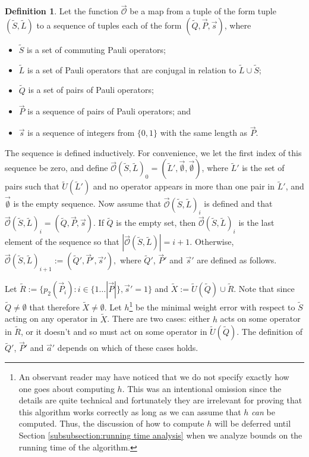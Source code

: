 \documentclass[12pt]{amsbook}
\theoremstyle{plain}
\theoremstyle{definition}
\newtheorem{definition}{Definition}
\theoremstyle{remark}
\newcommand{\lst}{\vec}
\newcommand{\set}{\tilde}
\newcommand{\optimizer}{\lst{\mathcal{O}}}
\begin{document}
\begin{definition}
Let the function $\optimizer$ be a map from a tuple of the form tuple $(\set S,\set L)$ to a sequence of tuples each of the form $(\set Q,\lst P,\lst s)$, where
\begin{itemize}
\item $\set S$ is a set of commuting Pauli operators;
\item $\set L$ is a set of Pauli operators that are conjugal in relation to $\set L\cup\set S$;
\item $\set Q$ is a set of pairs of Pauli operators;
\item $\lst P$ is a sequence of pairs of Pauli operators; and
\item $\lst s$ is a sequence of integers from $\{0,1\}$ with the same length as $\lst P$.
\end{itemize}

The sequence is defined inductively.  For convenience, we let the first index of this sequence be zero, and define $\optimizer(\set S,\set L)_0=(\set L',\lst\emptyset,\lst\emptyset)$, where $\set L'$ is the set of pairs such that $\set U(\set L')$ and no operator appears in more than one pair in $\set L'$, and $\lst\emptyset$ is the empty sequence.  Now assume that $\optimizer(\set S,\set L)_i$ is defined and that $\optimizer(\set S,\set L)_i=(\set Q,\lst P,\lst s)$.  If $\set Q$ is the empty set, then $\optimizer(\set S,\set L)_i$ is the last element of the sequence so that $|\optimizer(\set S,\set L)|=i+1$.  Otherwise, $\optimizer(\set S,\set L)_{i+1}:=(\set Q',\lst P',\lst s'),$ where $\set Q'$, $\lst P'$ and $\lst s'$ are defined as follows.

Let $\set R:=\{p_2(\lst P_i):i\in\{1\dots |\lst P|\},\lst s'=1\}$ and $\set X:=\set U(\set Q)\cup\set R$.  Note that since $\set Q\ne\emptyset$ that therefore $\set X\ne\emptyset$.  Let $h$\footnote{An observant reader may have noticed that we do not specify exactly how one goes about computing $h$.  This was an intentional omission since the details are quite technical and fortunately they are irrelevant for proving that this algorithm works correctly as long as we can assume that $h$ \emph{can} be computed.  Thus, the discussion of how to compute $h$ will be deferred until Section \ref{subsubsection:running time analysis} when we analyze bounds on the running time of the algorithm.} be the minimal weight error with respect to $\set S$ acting on any operator in $\set X$.  There are two cases: either $h$ acts on some operator in $\set R$, or it doesn't and so must act on some operator in $\set U(\set Q)$.  The definition of $\set Q'$, $\lst P'$ and $\lst a'$ depends on which of these cases holds.


\end{definition}
\end{document}
